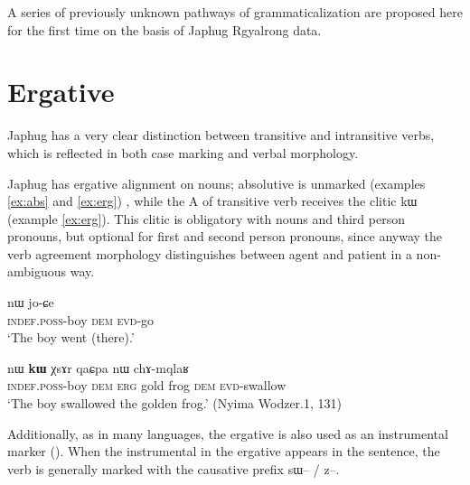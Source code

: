 \documentclass[oldfontcommands,oneside,a4paper,11pt]{article}
\newcommand{\ipa}[1]{{\phon #1}} %
\begin{document}
 A series of previously unknown pathways of grammaticalization are proposed here for the first time on the basis of Japhug Rgyalrong data.

\section{Ergative} \label{sec:erg}
Japhug has a very clear   distinction between transitive and intransitive verbs, which is reflected in both case marking and verbal morphology.

Japhug has ergative alignment on nouns; absolutive is unmarked (examples \ref{ex:abs} and \ref{ex:erg}) , while the A of transitive verb receives the clitic \ipa{kɯ} (example \ref{ex:erg}). This clitic is obligatory with nouns and third person pronouns, but optional for first and second person pronouns, since anyway the verb agreement morphology distinguishes between agent and patient in a non-ambiguous way.

\begin{exe}
\ex \label{ex:abs}
\gll \ipa{tɤ-tɕɯ}  	\ipa{nɯ}  	 	\ipa{jo-ɕe}   \\
\textsc{indef.poss}-boy \textsc{dem}   \textsc{evd}-go \\
\glt `The boy went (there).'
\end{exe}

\begin{exe}
\ex \label{ex:erg}
\gll \ipa{tɤ-tɕɯ}  	\ipa{nɯ}  	\ipa{\textbf{kɯ}} 	\ipa{χsɤr}  	\ipa{qaɕpa}  	\ipa{nɯ}  	\ipa{chɤ-mqlaʁ}   \\
\textsc{indef.poss}-boy \textsc{dem} \textsc{erg} gold frog \textsc{dem} \textsc{evd}-swallow \\
\glt `The boy swallowed the golden frog.' (Nyima Wodzer.1, 131)
\end{exe}


Additionally, as in many languages, the ergative is also used as an instrumental marker (\citealt[32]{agent02palancar}). When the instrumental in the ergative appears in the sentence, the verb is generally marked with the causative prefix \ipa{sɯ}-- / \ipa{z}--. 
\end{document}
